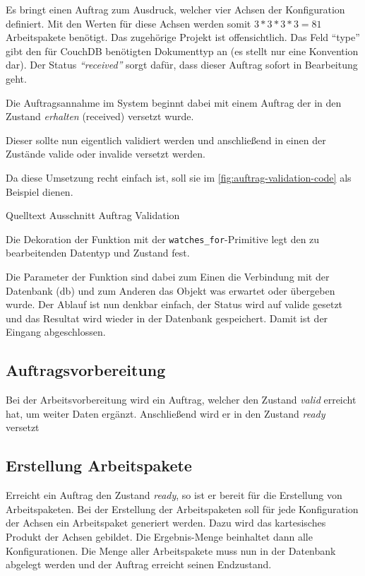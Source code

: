 Es bringt einen Auftrag zum Ausdruck, welcher vier Achsen der Konfiguration definiert.
Mit den Werten für diese Achsen werden somit $3*3*3*3 = 81$ Arbeitspakete benötigt.
Das zugehörige Projekt ist offensichtlich. Das Feld ``type'' gibt den für CouchDB benötigten Dokumenttyp an (es stellt nur eine Konvention dar).
Der Status \textit{``received''} sorgt dafür, dass dieser Auftrag sofort in Bearbeitung geht.

\FloatBarrier
Die Auftragsannahme im System beginnt dabei mit einem Auftrag der in den Zustand \textit{erhalten} (received) versetzt wurde.

Dieser sollte nun eigentlich validiert werden und anschließend in einen der Zustände valide oder invalide versetzt werden.

Da diese Umsetzung recht einfach ist, soll sie im \cref{fig:auftrag-validation-code} als Beispiel dienen.

\begin{listing}[h]
\caption{Quelltext Ausschnitt Auftrag Validation}
\label{fig:auftrag-validation-code}
\end{listing}

Die Dekoration \cite{python:decorator}
der Funktion mit der \verb|watches_for|-Primitive legt den zu bearbeitenden Datentyp und Zustand fest.

Die Parameter der Funktion sind dabei zum Einen die Verbindung mit der Datenbank (db) und
zum Anderen das Objekt was erwartet oder übergeben wurde.
Der Ablauf ist nun denkbar einfach, der Status wird auf valide gesetzt und das Resultat wird wieder in der Datenbank gespeichert.
Damit ist der Eingang abgeschlossen.

\FloatBarrier
\subsection{Auftragsvorbereitung}

Bei der Arbeitsvorbereitung wird ein Auftrag,
welcher den Zustand \textit{valid} erreicht hat, um weiter Daten ergänzt.
Anschließend wird er in den Zustand \textit{ready} versetzt

\subsection{Erstellung Arbeitspakete}

Erreicht ein Auftrag den Zustand \textit{ready}, so ist er bereit für die Erstellung von Arbeitspaketen.
Bei der Erstellung der Arbeitspaketen soll für jede Konfiguration der Achsen ein Arbeitspaket generiert werden.
Dazu wird das kartesisches Produkt der Achsen gebildet.
Die Ergebnis-Menge beinhaltet dann alle Konfigurationen.
Die Menge aller Arbeitspakete muss nun in der Datenbank abgelegt werden
und der Auftrag erreicht seinen Endzustand.

